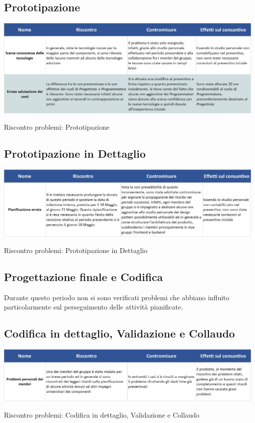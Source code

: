 \subsection{Prototipazione}
\begin{table}[h!]
	\centerline{\includegraphics[scale=0.55]{img/Rischi/RiscontroProblemi-Prototipazione.jpg}}
	\caption{Riscontro problemi: Prototipazione}
\end{table}
\clearpage

\subsection{Prototipazione in Dettaglio} \label{RiscontroPrototipazioneDettaglio}
\begin{table}[h!]
	\centerline{\includegraphics[scale=0.55]{img/Rischi/RiscontroProblemi-PrototipazioneDettaglio.jpg}}
	\caption{Riscontro problemi: Prototipazione in Dettaglio}
\end{table}

\subsection{Progettazione finale e Codifica}
Durante questo periodo non si sono verificati problemi che abbiano influito particolarmente sul perseguimento delle attività pianificate.

\subsection{Codifica in dettaglio, Validazione e Collaudo} \label{RiscontroCodificaValidazioneCollaudo}
\begin{table}[h!]
	\centerline{\includegraphics[scale=0.55]{img/Rischi/RiscontroProblemi-CodificaValidazioneCollaudo.jpg}}
	\caption{Riscontro problemi: Codifica in dettaglio, Validazione e Collaudo}
\end{table}
